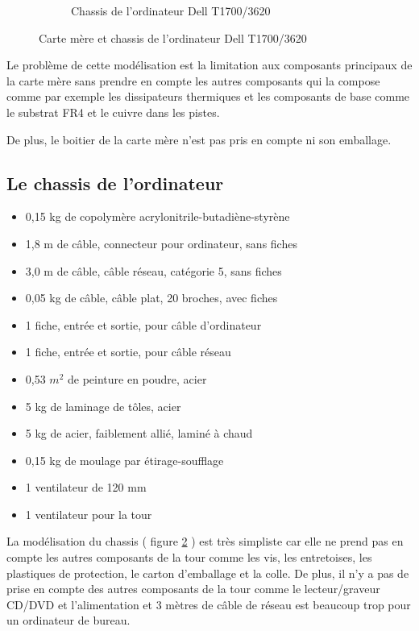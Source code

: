 \begin{figure}[h]
\begin{subfigure}[t]{0.47\textwidth}
        \caption{Chassis de l'ordinateur Dell T1700/3620}
        \label{fig:chassis-dell}
    \end{subfigure}
    \caption{Carte mère et chassis de l'ordinateur Dell T1700/3620}
\end{figure}

\vspace{5pt}
Le problème de cette modélisation est la limitation aux composants principaux de la carte mère sans prendre en compte les autres composants qui la compose comme par exemple les dissipateurs thermiques et les composants de base comme le substrat FR4 et le cuivre dans les pistes.

De plus, le boitier de la carte mère n'est pas pris en compte ni son emballage.


\subsection{Le chassis de l'ordinateur}

\begin{itemize}
    \item 0,15 kg de copolymère acrylonitrile-butadiène-styrène
    \item 1,8 m de câble, connecteur pour ordinateur, sans fiches
    \item 3,0 m de câble, câble réseau, catégorie 5, sans fiches
    \item 0,05 kg de câble, câble plat, 20 broches, avec fiches
    \item 1 fiche, entrée et sortie, pour câble d'ordinateur
    \item 1 fiche, entrée et sortie, pour câble réseau
    \item 0,53 $m^2$ de peinture en poudre, acier
    \item 5 kg de laminage de tôles, acier
    \item 5 kg de acier, faiblement allié, laminé à chaud
    \item 0,15 kg de moulage par étirage-soufflage
    \item 1 ventilateur de 120 mm
    \item 1 ventilateur pour la tour
\end{itemize}

\vspace{5pt}

La modélisation du chassis ( figure \ref{fig:chassis-dell} ) est très simpliste car elle ne prend pas en compte les autres composants de la tour comme les vis, les entretoises, les plastiques de protection, le carton d'emballage et la colle. De plus, il n'y a pas de prise en compte des autres composants de la tour comme le lecteur/graveur CD/DVD et l'alimentation et 3 mètres de câble de réseau est beaucoup trop pour un ordinateur de bureau.

